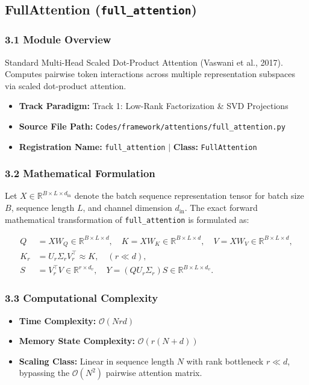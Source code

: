 \subsection{FullAttention (\texttt{full\_attention})}
\label{sec:app_module_full_attention}

\subsubsection*{3.1 Module Overview}
Standard Multi-Head Scaled Dot-Product Attention (Vaswani et al., 2017). Computes pairwise token interactions across multiple representation subspaces via scaled dot-product attention.
\begin{itemize}
    \item \textbf{Track Paradigm:} Track 1: Low-Rank Factorization \& SVD Projections
    \item \textbf{Source File Path:} \texttt{Codes/framework/attentions/full\_attention.py}
    \item \textbf{Registration Name:} \texttt{full\_attention} $\mid$ \textbf{Class:} \texttt{FullAttention}
\end{itemize}

\subsubsection*{3.2 Mathematical Formulation}
Let $X \in \mathbb{R}^{B \times L \times d_{\text{in}}}$ denote the batch sequence representation tensor for batch size $B$, sequence length $L$, and channel dimension $d_{\text{in}}$. The exact forward mathematical transformation of \texttt{full\_attention} is formulated as:

\begin{align}
Q &= X W_Q \in \mathbb{R}^{B \times L \times d}, \quad K = X W_K \in \mathbb{R}^{B \times L \times d}, \quad V = X W_V \in \mathbb{R}^{B \times L \times d}, \\
K_r &= U_r \Sigma_r V_r^\top \approx K, \quad (r \ll d), \\
S &= V_r^\top V \in \mathbb{R}^{r \times d_v}, \quad Y = (Q U_r \Sigma_r) S \in \mathbb{R}^{B \times L \times d_v}.
\end{align}


\subsubsection*{3.3 Computational Complexity}
\begin{itemize}
    \item \textbf{Time Complexity:} $\mathcal{O}(N r d)$
    \item \textbf{Memory State Complexity:} $\mathcal{O}(r(N + d))$
    \item \textbf{Scaling Class:} Linear in sequence length $N$ with rank bottleneck $r \ll d$, bypassing the $\mathcal{O}(N^2)$ pairwise attention matrix.
\end{itemize}

